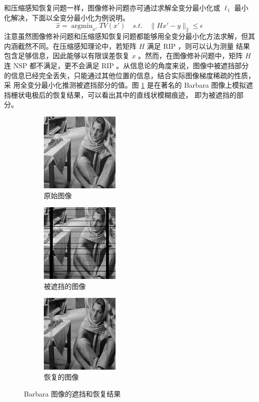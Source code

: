 和压缩感知恢复问题一样，图像修补问题亦可通过求解全变分最小化或 $\ell_1$
最小化解决，下面以全变分最小化为例说明。
\begin{equation}
\hat x = \mathop{\arg\min}_{x'} TV(x') \quad s.t. \quad
\|Hx' - y\|_2 \leq \epsilon
\end{equation}
注意虽然图像修补问题和压缩感知恢复问题都能够用全变分最小化方法求解，但其
内涵截然不同。在压缩感知理论中，若矩阵 $H$ 满足 RIP ，则可以认为测量
结果包含足够信息，因此能够以有限误差恢复 $x$ 。然而，在图像修补问题中，矩阵
$H$ 连 NSP 都不满足，更不会满足 RIP 。从信息论的角度来说，图像中被遮挡部分
的信息已经完全丢失，只能通过其他位置的信息，结合实际图像梯度稀疏的性质，采
用全变分最小化推测被遮挡部分的值。图 \ref{fig:BarbaraMask} 是在著名的
Barbara 图像上模拟遮挡栅状电极后的恢复结果，可以看出其中的直线状模糊痕迹，
即为被遮挡的部分。

\begin{figure}
\centering
\begin{subfigure}[t]{1.5in}
\includegraphics[width=1.5in]{Figure/barbara.png}
\caption{原始图像}
\end{subfigure}
\begin{subfigure}[t]{1.5in}
\includegraphics[width=1.5in]{Figure/barbara_mask.png}
\caption{被遮挡的图像}
\end{subfigure}
\begin{subfigure}[t]{1.5in}
\includegraphics[width=1.5in]{Figure/barbara_out.png}
\caption{恢复的图像}
\end{subfigure}
\caption{Barbara 图像的遮挡和恢复结果}
\label{fig:BarbaraMask}
\end{figure}

